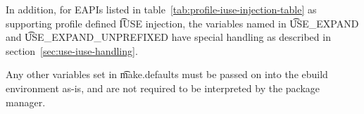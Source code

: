 In addition, for EAPIs listed in table~\ref{tab:profile-iuse-injection-table} as supporting profile
defined \t{IUSE} injection, the variables named in \t{USE\_EXPAND} and \t{USE\_EXPAND\_UNPREFIXED}
have special handling as described in section~\ref{sec:use-iuse-handling}.

Any other variables set in \t{make.defaults} must be passed on into the ebuild environment as-is,
and are not required to be interpreted by the package manager.


